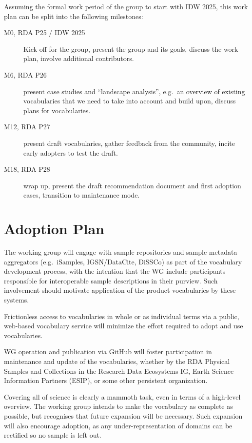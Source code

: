 \documentclass{scrartcl}
\begin{document}
Assuming the formal work period of the group to start with IDW 2025,
this work plan can be split into the following milestones:
\begin{description}
\item[M0, RDA P25 / IDW 2025] Kick off for the group, present the
  group and its goals, discuss the work plan, involve additional
  contributors.
\item[M6, RDA P26] present case studies and ``landscape analysis'',
  e.g.\ an overview of existing vocabularies that we need to take into
  account and build upon, discuss plans for vocabularies.
\item[M12, RDA P27] present draft vocabularies, gather feedback from
  the community, incite early adopters to test the draft.
\item[M18, RDA P28] wrap up, present the draft recommendation document
  and first adoption cases, transition to maintenance mode.
\end{description}

\section{Adoption Plan}

The working group will engage with sample repositories and sample
metadata aggregators (e.g.\ iSamples, IGSN/DataCite, DiSSCo) as part
of the vocabulary development process, with the intention that the WG
include participants responsible for interoperable sample descriptions
in their purview.  Such involvement should motivate application of the
product vocabularies by these systems.

Frictionless access to vocabularies in whole or as individual terms
via a public, web-based vocabulary service will minimize the effort
required to adopt and use vocabularies.

WG operation and publication via GitHub will foster participation in
maintenance and update of the vocabularies, whether by the RDA
Physical Samples and Collections in the Research Data Ecosystems IG,
Earth Science Information Partners (ESIP), or some other persistent
organization.

Covering all of science is clearly a mammoth task, even in terms of a
high-level overview.  The working group intends to make the vocabulary
as complete as possible, but recognises that future expansion will be
necessary.  Such expansion will also encourage adoption, as any
under-representation of domains can be rectified so no sample is left
out.
\end{document}
